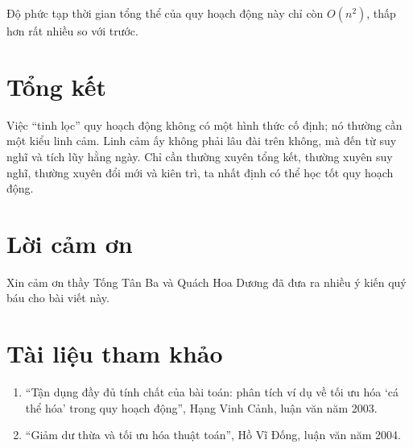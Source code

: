 \documentclass[11pt]{article}
\begin{document}
Độ phức tạp thời gian tổng thể của quy hoạch động này chỉ còn $O(n^2)$, thấp
hơn rất nhiều so với trước.

\section*{Tổng kết}

Việc ``tinh lọc'' quy hoạch động không có một hình thức cố định; nó thường cần
một kiểu linh cảm. Linh cảm ấy không phải lâu đài trên không, mà đến từ suy
nghĩ và tích lũy hằng ngày. Chỉ cần thường xuyên tổng kết, thường xuyên suy
nghĩ, thường xuyên đổi mới và kiên trì, ta nhất định có thể học tốt quy hoạch
động.

\section*{Lời cảm ơn}

Xin cảm ơn thầy Tống Tân Ba và Quách Hoa Dương đã đưa ra nhiều ý kiến quý báu
cho bài viết này.

\section*{Tài liệu tham khảo}

\begin{enumerate}
  \item ``Tận dụng đầy đủ tính chất của bài toán: phân tích ví dụ về tối ưu
  hóa `cá thể hóa' trong quy hoạch động'', Hạng Vinh Cảnh, luận văn năm 2003.
  \item ``Giảm dư thừa và tối ưu hóa thuật toán'', Hồ Vĩ Đống, luận văn năm
  2004.
\end{enumerate}
\end{document}
